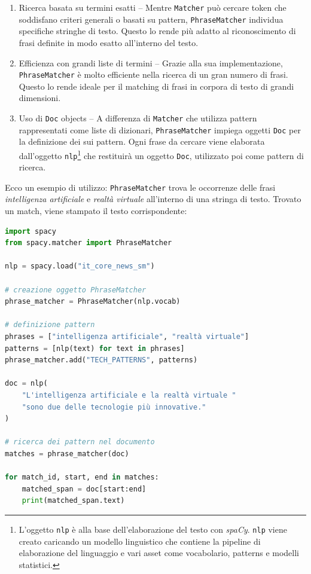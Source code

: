 \documentclass[12pt]{report}
\newcommand{\spacy}{\textsl{spaCy}\xspace}
\begin{document}
\begin{enumerate}
\item \textsf{Ricerca basata su termini esatti} -- Mentre \texttt{Matcher} può cercare token che soddisfano criteri generali o basati su pattern, \texttt{PhraseMatcher} individua specifiche stringhe di testo. Questo lo rende più adatto al riconoscimento di frasi definite in modo esatto all'interno del testo.
\item \textsf{Efficienza con grandi liste di termini} -- Grazie alla sua implementazione, \texttt{PhraseMatcher} è molto efficiente nella ricerca di un gran numero di frasi. Questo lo rende ideale per il matching di frasi in corpora di testo di grandi dimensioni.
\item \textsf{Uso di \texttt{Doc} objects} -- A differenza di \texttt{Matcher} che utilizza pattern rappresentati come liste di dizionari, \texttt{PhraseMatcher} impiega oggetti \texttt{Doc} per la definizione dei sui pattern. Ogni frase da cercare viene elaborata dall'oggetto \texttt{nlp}\footnote{L'oggetto \texttt{nlp} è alla base dell'elaborazione del testo con \spacy. \texttt{nlp} viene creato caricando un modello linguistico che contiene la pipeline di elaborazione del linguaggio e vari asset come vocabolario, patterns e modelli statistici.} che restituirà un oggetto \texttt{Doc}, utilizzato poi come pattern di ricerca.
\end{enumerate}


\begin{mdframed}
\small
Ecco un esempio di utilizzo: \texttt{PhraseMatcher} trova le occorrenze delle frasi \textit{intelligenza artificiale} e \textit{realtà virtuale} all'interno di una stringa di testo. Trovato un match, viene stampato il testo corrispondente:

\begin{lstlisting}[language=Python]
import spacy
from spacy.matcher import PhraseMatcher

nlp = spacy.load("it_core_news_sm")

# creazione oggetto PhraseMatcher
phrase_matcher = PhraseMatcher(nlp.vocab)

# definizione pattern
phrases = ["intelligenza artificiale", "realtà virtuale"]
patterns = [nlp(text) for text in phrases]
phrase_matcher.add("TECH_PATTERNS", patterns)

doc = nlp(
    "L'intelligenza artificiale e la realtà virtuale "
    "sono due delle tecnologie più innovative."
)

# ricerca dei pattern nel documento
matches = phrase_matcher(doc)

for match_id, start, end in matches:
    matched_span = doc[start:end]
    print(matched_span.text)
\end{lstlisting}
\end{mdframed}
\end{document}
